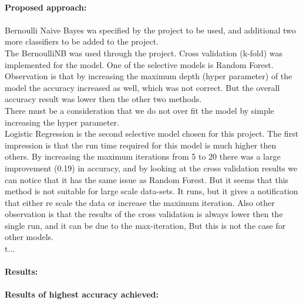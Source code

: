 \documentclass[12pt]{report}
\begin{document}
	
	\paragraph{}
	\paragraph{Proposed approach:}
	\paragraph{}
		Bernoulli Naive Bayes wa specified by the project to be used, and additional two more classifiers to be added to the project.\\
		The BernoulliNB was used through the project. Cross validation (k-fold) was implemented for the model. 
		One of the selective models is Random Forest. Observation is that by increasing the maximum depth (hyper parameter) of the model the accuracy increased as well, which was not correct. But the overall accuracy result was lower then the other two methods. \\
		There must be a consideration that we do not over fit the model by simple increasing the hyper parameter. \\
		Logistic Regression is the second selective model chosen for this project. The first impression is that the run time required for this model is much higher then others. By increasing the maximum iterations from 5 to 20 there was a large improvement (0.19) in accuracy, and by looking at the cross validation results we can notice that it has the same issue as Random Forest. But it seems that this method is not suitable for large scale data-sets. It runs, but it gives a notification that either re scale the data or increase the maximum iteration. Also other observation is that the results of the cross validation is always lower then the single run, and it can be due to the max-iteration, But this is not the case for other models. \\t...


	
	
	\paragraph{Results:}
	\paragraph{}
	\paragraph{Results of highest accuracy achieved:}
\end{document}

